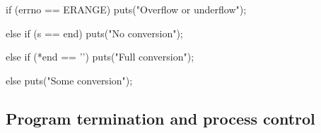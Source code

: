 \documentclass{report}
\begin{document}
\begin{itemize}
\begin{cppcode}
                if (errno == ERANGE) {
                    puts("Overflow or underflow");
                }

                else if (s == end) {
                    puts("No conversion");
                }

                else if (*end == '\0') {
                    puts("Full conversion");
                }

                else {
                    puts("Some conversion");
                }
            \end{cppcode}



    \end{itemize}

    \pagebreak 
    \subsection{Program termination and process control}
\end{document}
